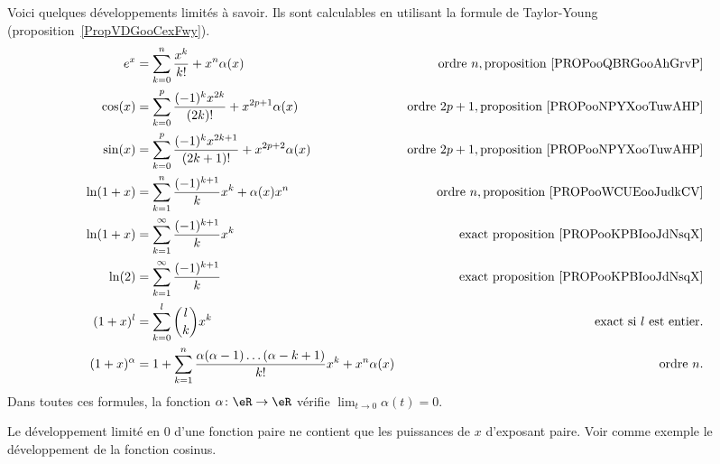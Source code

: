 \begin{description}
Voici quelques développements limités à savoir. Ils sont calculables en utilisant la formule de Taylor-Young (proposition~\ref{PropVDGooCexFwy}).
\begin{subequations}
    \begin{align*}
        e^x&=\sum_{k=0}^n\frac{ x^k }{ k! }+x^n\alpha(x)&\text{ordre } n, \text{proposition \ref{PROPooQBRGooAhGrvP}}\\
        \cos(x)&=\sum_{k=0}^p\frac{ (-1)^kx^{2k} }{ (2k)! }+x^{2p+1}\alpha(x)&\text{ordre } 2p+1,\text{proposition \ref{PROPooNPYXooTuwAHP}}\\
        \sin(x)&=\sum_{k=0}^p\frac{ (-1)^kx^{2k+1} }{ (2k+1)! }+x^{2p+2}\alpha(x)&\text{ordre } 2p+1,\text{proposition \ref{PROPooNPYXooTuwAHP}}\\
        \ln(1+x)&=\sum_{k=1}^n\frac{ (-1)^{k+1} }{ k }x^k+\alpha(x)x^n&\text{ordre }n,\text{proposition \ref{PROPooWCUEooJudkCV}}\\
        \ln(1+x)&=\sum_{k=1}^{\infty}\frac{ (-1)^{k+1} }{ k }x^k&\text{exact }\text{proposition \ref{PROPooKPBIooJdNsqX}}\\
        \ln(2)&=\sum_{k=1}^{\infty}\frac{ (-1)^{k+1} }{ k }&\text{exact }\text{proposition \ref{PROPooKPBIooJdNsqX}}\\
      (1+x)^l&=\sum_{k=0}^l\binom{ l }{ k }x^k&\text{exact si } l\text{ est entier.}\\
      (1+x)^{\alpha}&=1+\sum_{k=1}^n\frac{ \alpha(\alpha-1)\ldots(\alpha-k+1) }{ k! }x^k+x^n\alpha(x)&\text{ordre } n.
    \end{align*}
\end{subequations}
  Dans toutes ces formules, la fonction \( \alpha\colon \eR\to \eR\) vérifie \( \lim_{t\to 0} \alpha(t)=0\).

Le développement limité en $0$ d'une fonction paire ne contient que les puissances de $x$ d'exposant paire. Voir comme exemple le développement de la fonction cosinus.

\end{description}

      \label{THEMEooUJVXooZdlmHj}

